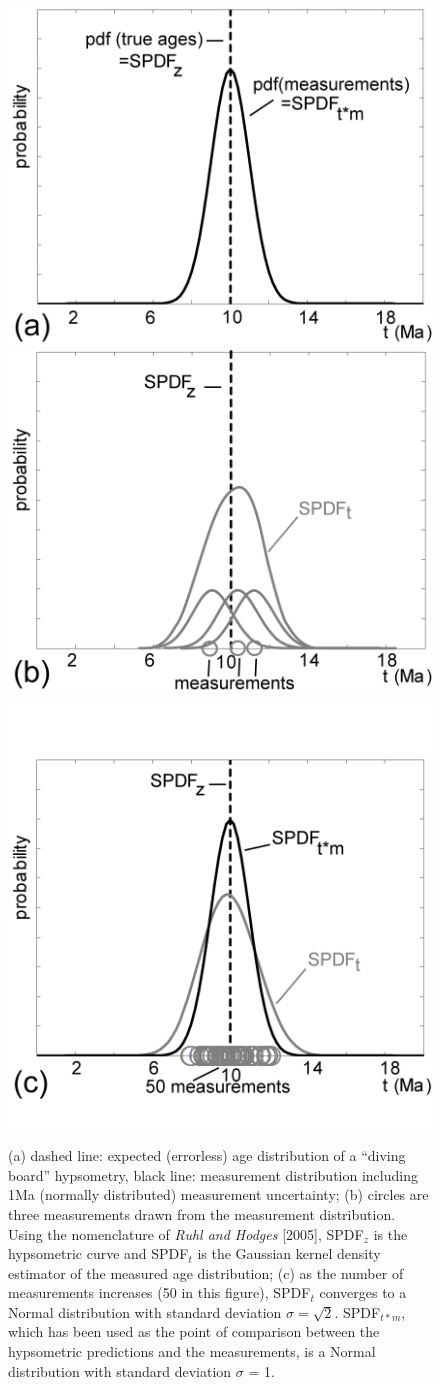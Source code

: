 \documentclass[12pt,twoside]{article}
\begin{document}
\begin{figure}[htbp]
  \centering 
\includegraphics[width=.32\textwidth]{fig4a.jpg}
\includegraphics[width=.32\textwidth]{fig4b.jpg}
\includegraphics[width=.32\textwidth]{fig4c.jpg}
  \caption[Comparison of probability density estimators for a ``diving
  board  hypsometry'']  {(a)  dashed  line: expected  (errorless)  age
    distribution  of  a   ``diving  board''  hypsometry,  black  line:
    measurement  distribution  including  1Ma  (normally  distributed)
    measurement uncertainty; (b)  circles are three measurements drawn
    from the measurement distribution.  Using the nomenclature of {\it
      Ruhl and  Hodges} [2005], SPDF$_z$ is the  hypsometric curve and
    SPDF$_t$ is the Gaussian  kernel density estimator of the measured
    age distribution; (c) as  the number of measurements increases (50
    in this figure), SPDF$_t$  converges to a Normal distribution with
    standard deviation  $\sigma = \sqrt{2}$.   SPDF$_{t*m}$, which has
    been  used as  the  point of  comparison  between the  hypsometric
    predictions and  the measurements,  is a Normal  distribution with
    standard deviation $\sigma$ = 1.}
  \label{fig:divingBoardPdf}
\end{figure}
\end{document}
